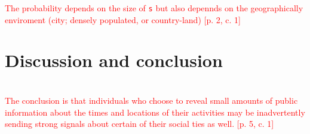 \textcolor{red}{The probability depends on the size of \texttt{s} but also depennds on the geographically enviroment (city; densely populated, or country-land) [p. 2, c. 1]}


\section{Discussion and conclusion}\\
\textcolor{red}{The conclusion is that individuals who choose to reveal small amounts of public information about the times and locations of their activities may be inadvertently sending strong signals about certain of their social ties as well. [p. 5, c. 1]}